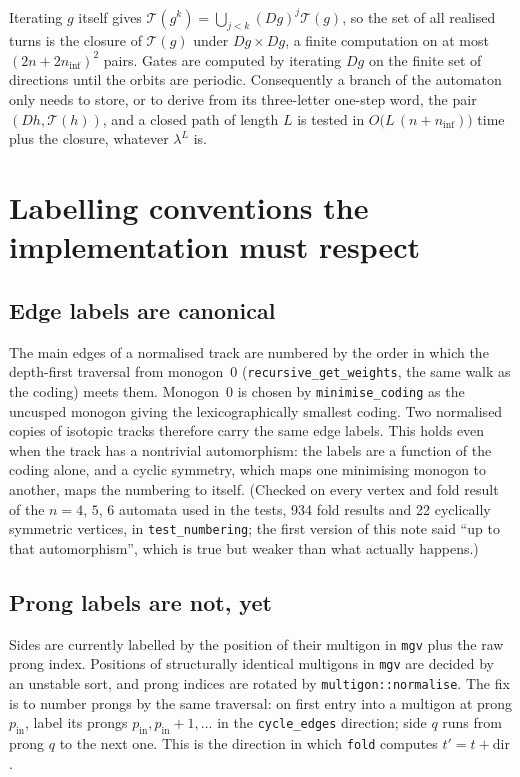 \documentclass[12pt]{amsart}
\newcommand{\code}[1]{\texttt{#1}}
\newcommand{\Dg}{D}                       %
\newcommand{\turns}{\mathcal{T}}
\newcommand{\lam}{\lambda}
\theoremstyle{plain}
\theoremstyle{definition}
\begin{document}
Iterating $g$ itself gives $\turns(g^k) = \bigcup_{j<k}(\Dg g)^j\turns(g)$,
so the set of all realised turns is the closure of $\turns(g)$ under
$\Dg g\times\Dg g$, a finite computation on at most $(2n+2n_{\mathrm{inf}})^2$
pairs.  Gates are computed by iterating $\Dg g$ on the finite set of
directions until the orbits are periodic.  Consequently a branch of the
automaton only needs to store, or to derive from its three-letter
one-step word, the pair $(\Dg h,\turns(h))$, and a closed path of length
$L$ is tested in $O\bigl(L\,(n+n_{\mathrm{inf}})\bigr)$ time plus the
closure, whatever $\lam^L$ is.

\section{Labelling conventions the implementation must respect}
\label{sec:labels}

\subsection*{Edge labels are canonical}
The main edges of a normalised track are numbered by the order in which
the depth-first traversal from monogon~0 (\code{recursive\_get\_weights},
the same walk as the coding) meets them.  Monogon~0 is chosen by
\code{minimise\_coding} as the uncusped monogon giving the
lexicographically smallest coding.  Two normalised copies of isotopic
tracks therefore carry the same edge labels.  This holds even when the
track has a nontrivial automorphism: the labels are a function of the
coding alone, and a cyclic symmetry, which maps one minimising monogon to
another, maps the numbering to itself.  (Checked on every vertex and fold
result of the $n=4$, $5$, $6$ automata used in the tests, 934 fold results
and 22 cyclically symmetric vertices, in \code{test\_numbering}; the
first version of this note said ``up to that automorphism'', which is
true but weaker than what actually happens.)

\subsection*{Prong labels are not, yet}
Sides are currently labelled by the position of their multigon in
\code{mgv} plus the raw prong index.  Positions of structurally identical
multigons in \code{mgv} are decided by an unstable sort, and prong indices
are rotated by \code{multigon::normalise}.  The fix is to number prongs by
the same traversal: on first entry into a multigon at prong $p_{\mathrm{in}}$,
label its prongs $p_{\mathrm{in}}, p_{\mathrm{in}}+1,\dots$ in the
\code{cycle\_edges} direction; side $q$ runs from prong $q$ to the next
one.  This is the direction in which \code{fold} computes
$t' = t+\mathrm{dir}$.
\end{document}

